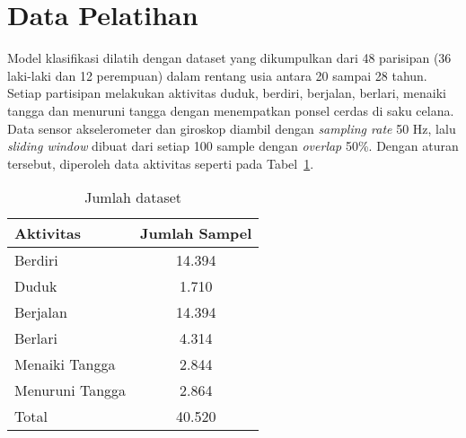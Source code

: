 


\section{Data Pelatihan}
Model klasifikasi dilatih dengan dataset yang dikumpulkan dari 48 parisipan (36 laki-laki dan 12 perempuan) dalam rentang usia antara 20 sampai 28 tahun. Setiap partisipan melakukan aktivitas duduk, berdiri, berjalan, berlari, menaiki tangga dan menuruni tangga dengan menempatkan ponsel cerdas di saku celana. Data sensor akselerometer dan giroskop diambil dengan \textit{sampling rate} 50 Hz, lalu \textit{sliding window} dibuat dari setiap 100 sample dengan \textit{overlap} 50\%. Dengan aturan tersebut, diperoleh data aktivitas seperti pada Tabel~\ref{table:jumlah-dataset}.

\begin{table}[h!]
    \centering
    \caption{Jumlah dataset}
    \begin{tabular}{ |l|c| }
        \hline
        Aktivitas & Jumlah Sampel \\

        \hline
        Berdiri & 14.394 \\

        \hline
        Duduk & 1.710 \\

        \hline
        Berjalan & 14.394 \\

        \hline
        Berlari & 4.314 \\

        \hline
        Menaiki Tangga & 2.844 \\

        \hline
        Menuruni Tangga & 2.864 \\

        \hline
        Total & 40.520 \\

        \hline
    \end{tabular}
    \label{table:jumlah-dataset}
\end{table}

